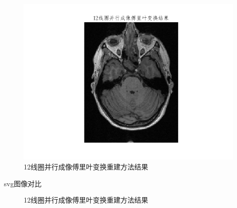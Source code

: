 \begin{figure}[H]
    \centering
    \includegraphics[width=1\linewidth]{fig/12coil_pi_recon.png}
    \caption{12线圈并行成像傅里叶变换重建方法结果}
    \label{fig:coil12_pi_recon}
\end{figure}

svg图像对比
\begin{figure}[H]
    \centering
    
    \caption{12线圈并行成像傅里叶变换重建方法结果}
    \label{fig:coil12_pi_reconsvg}
\end{figure}


